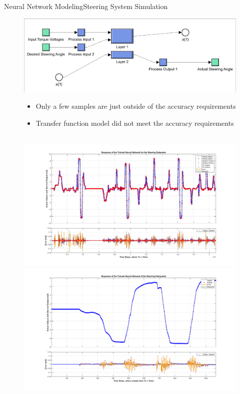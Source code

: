 \documentclass{beamer}
\begin{document}
\begin{frame}{Neural Network Modeling}{Steering System Simulation}
	\begin{block}{}
  		\begin{figure}[H]
  			\centering \includegraphics[width=.45\linewidth , height=.37\textheight]{figs/img/steeringSimulinkBlock.jpg}\quad%
			\centering \begin{minipage}[b][0.4\textheight][c]{.45\linewidth}  \begin{itemize}
			\item Only a few samples are just outside of the accuracy requirements
			\item Transfer function model did not meet the accuracy requirements
			\end{itemize} \end{minipage}\\[1em]
			\centering \includegraphics[width=.45\linewidth , height=.37\textheight]{figs/img/steeringNeuralNetworkTrainedOutput.jpg}\quad%
			\centering \includegraphics[width=.45\linewidth , height=.37\textheight]{figs/img/steeringNeuralNetworkTrainedOutput2.jpg}
  		\end{figure}
	\end{block}
\end{frame}
\end{document}
